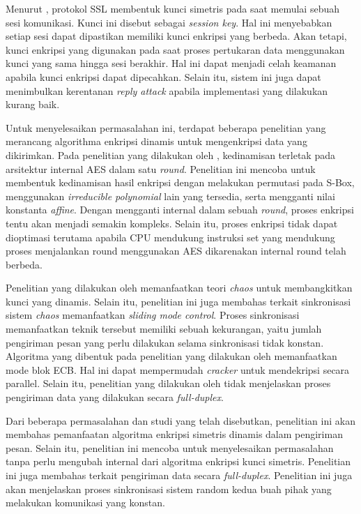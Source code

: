 Menurut \textcite{munir2019}, protokol SSL membentuk kunci simetris pada saat memulai sebuah sesi komunikasi. Kunci ini disebut sebagai \emph{session key}. Hal ini menyebabkan setiap sesi dapat dipastikan memiliki kunci enkripsi yang berbeda. Akan tetapi, kunci enkripsi yang digunakan pada saat proses pertukaran data menggunakan kunci yang sama hingga sesi berakhir. Hal ini dapat menjadi celah keamanan apabila kunci enkripsi dapat dipecahkan. Selain itu, sistem ini juga dapat menimbulkan kerentanan \emph{reply attack} apabila implementasi yang dilakukan kurang baik.

Untuk menyelesaikan permasalahan ini, terdapat beberapa penelitian yang merancang algorithma enkripsi dinamis untuk mengenkripsi data yang dikirimkan. Pada penelitian yang dilakukan oleh \textcite{singh2019}, kedinamisan terletak pada arsitektur internal AES dalam satu \emph{round}. Penelitian ini mencoba untuk membentuk kedinamisan hasil enkripsi dengan melakukan permutasi pada S-Box, menggunakan \emph{irreducible polynomial} lain yang tersedia, serta mengganti nilai konstanta \emph{affine}. Dengan mengganti internal dalam sebuah \emph{round}, proses enkripsi tentu akan menjadi semakin kompleks. Selain itu, proses enkripsi tidak dapat dioptimasi terutama apabila CPU mendukung instruksi set yang mendukung proses menjalankan round menggunakan AES dikarenakan internal round telah berbeda.

Penelitian yang dilakukan oleh \textcite{lin2021} memanfaatkan teori \emph{chaos} untuk membangkitkan kunci yang dinamis. Selain itu, penelitian ini juga membahas terkait sinkronisasi sistem \emph{chaos} memanfaatkan \emph{sliding mode control}. Proses sinkronisasi memanfaatkan teknik tersebut memiliki sebuah kekurangan, yaitu jumlah pengiriman pesan yang perlu dilakukan selama sinkronisasi tidak konstan. Algoritma yang dibentuk pada penelitian yang dilakukan oleh \textcite{lin2021} memanfaatkan mode blok ECB. Hal ini dapat mempermudah \emph{cracker} untuk mendekripsi secara parallel. Selain itu, penelitian yang dilakukan oleh \textcite{lin2021} tidak menjelaskan proses pengiriman data yang dilakukan secara \emph{full-duplex}.

Dari beberapa permasalahan dan studi yang telah disebutkan, 
penelitian ini akan membahas pemanfaatan algoritma enkripsi simetris dinamis dalam pengiriman pesan. Selain itu, penelitian ini mencoba untuk menyelesaikan permasalahan tanpa perlu mengubah internal dari algoritma enkripsi kunci simetris. Penelitian ini juga membahas terkait pengiriman data secara \emph{full-duplex}. Penelitian ini juga akan menjelaskan proses sinkronisasi sistem random kedua buah pihak yang melakukan komunikasi yang konstan.


